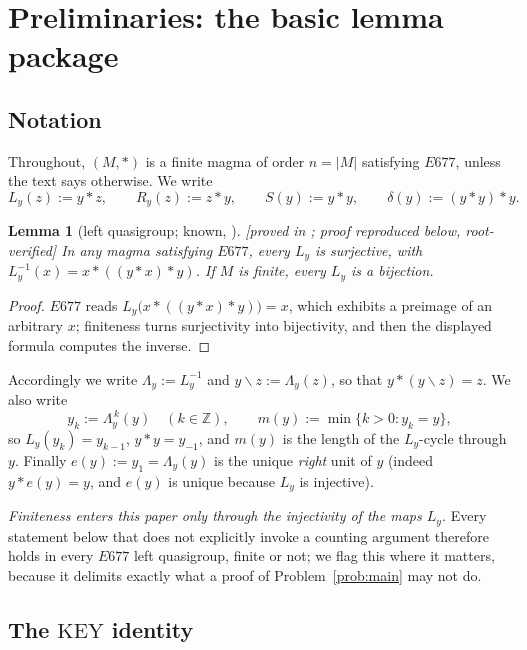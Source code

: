 \documentclass[11pt]{article}
\theoremstyle{plain}
\newtheorem{lemma}[theorem]{Lemma}
\theoremstyle{definition}
\theoremstyle{remark}
\numberwithin{equation}{section}
\newcommand{\Z}{\mathbb{Z}}
\newcommand{\op}{\mathbin{*}}
\newcommand{\statusbox}[1]{{\small\sloppy\textsf{[#1]}}}
\newcommand{\PROVED}[1]{\statusbox{proved in #1, root-verified}}
\begin{document}
\section{Preliminaries: the basic lemma package}\label{sec:prelim}

\subsection{Notation}

Throughout, $(M,\op)$ is a finite magma of order $n = |M|$ satisfying $E677$, unless the text
says otherwise. We write
\[
  L_y(z) := y \op z, \qquad R_y(z) := z\op y, \qquad
  S(y) := y\op y, \qquad \delta(y) := (y\op y)\op y .
\]

\begin{lemma}[left quasigroup; known, {\cite[Lemma~13.1(i)]{blueprint}}]\label{lem:lq}
\PROVED{\cite[Lemma~13.1(i)]{blueprint}; proof reproduced below}
In any magma satisfying $E677$, every $L_y$ is surjective, with
$L_y^{-1}(x) = x\op((y\op x)\op y)$. If $M$ is finite, every $L_y$ is a bijection.
\end{lemma}

\begin{proof}
$E677$ reads $L_y\bigl(x\op((y\op x)\op y)\bigr) = x$, which exhibits a preimage of an
arbitrary $x$; finiteness turns surjectivity into bijectivity, and then the displayed formula
computes the inverse.
\end{proof}

Accordingly we write $\Lambda_y := L_y^{-1}$ and $y\backslash z := \Lambda_y(z)$, so that
$y \op (y\backslash z) = z$. We also write
\[
  y_k := \Lambda_y^{\,k}(y) \quad (k\in\Z), \qquad
  m(y) := \min\{k>0 : y_k = y\},
\]
so $L_y(y_k) = y_{k-1}$, $y\op y = y_{-1}$, and $m(y)$ is the length of the $L_y$-cycle
through $y$. Finally $e(y) := y_1 = \Lambda_y(y)$ is the unique \emph{right} unit of $y$
(indeed $y\op e(y) = y$, and $e(y)$ is unique because $L_y$ is injective).

\emph{Finiteness enters this paper only through the injectivity of the maps $L_y$.} Every
statement below that does not explicitly invoke a counting argument therefore holds in every
$E677$ left quasigroup, finite or not; we flag this where it matters, because it delimits
exactly what a proof of Problem~\ref{prob:main} may not do.

\subsection{The $\mathrm{KEY}$ identity}
\end{document}

